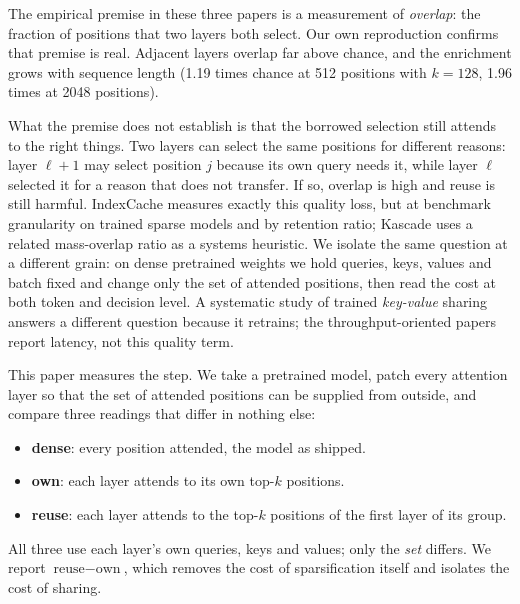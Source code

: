 \documentclass[10pt]{article}
\begin{document}
The empirical premise in these three papers is a measurement of \emph{overlap}: the
fraction of positions that two layers both select. Our own reproduction
confirms that premise is real. Adjacent layers overlap far above chance,
and the enrichment grows with sequence length (1.19 times chance at 512
positions with $k=128$, 1.96 times at 2048 positions).

What the premise does not establish is that the borrowed selection still
attends to the right things. Two layers can select the same positions for
different reasons: layer $\ell{+}1$ may select position $j$ because its own
query needs it, while layer $\ell$ selected it for a reason that does not
transfer. If so, overlap is high and reuse is still harmful. IndexCache
\citep{indexcache} measures exactly this quality loss, but at benchmark
granularity on trained sparse models and by retention ratio; Kascade
\citep{kascade} uses a related mass-overlap ratio as a systems heuristic. We
isolate the same question at a different grain: on dense pretrained weights we
hold queries, keys, values and batch fixed and change only the set of attended
positions, then read the cost at both token and decision level. A systematic
study of trained \emph{key-value} sharing \citep{kvshare} answers a different
question because it retrains; the throughput-oriented papers
\citep{mli,clsa} report latency, not this quality term.

This paper measures the step. We take a pretrained model, patch every attention
layer so that the set of attended positions can be supplied from outside, and
compare three readings that differ in nothing else:

\begin{itemize}
\item \textbf{dense}: every position attended, the model as shipped.
\item \textbf{own}: each layer attends to its own top-$k$ positions.
\item \textbf{reuse}: each layer attends to the top-$k$ positions of the
      first layer of its group.
\end{itemize}

All three use each layer's own queries, keys and values; only the \emph{set}
differs. We report $\text{reuse} - \text{own}$, which removes the cost of
sparsification itself and isolates the cost of sharing.
\end{document}

